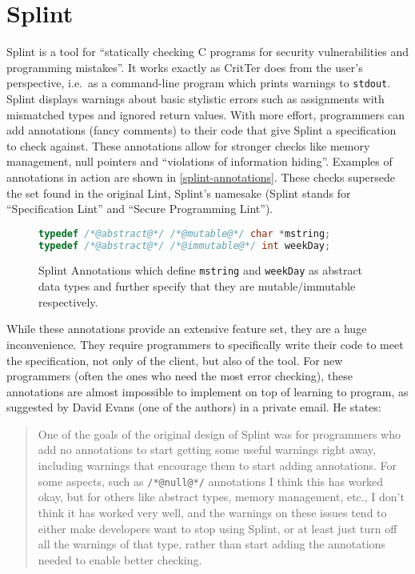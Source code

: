\documentclass[12pt]{report}
\newcommand{\programName}{CritTer\xspace}
\begin{document}
\section{Splint}
\label{sec:splint}

Splint is a tool for ``statically checking C programs for security vulnerabilities and programming 
mistakes''\cite[p.\ 9]{splint-manual}. It works exactly as \programName does from the user's
perspective, i.e.\ as a command-line program which prints warnings to \lstinline{stdout}. 
Splint displays warnings about basic stylistic errors such as assignments with mismatched types and 
ignored return values. With more effort, programmers can add annotations (fancy comments) to their 
code that give Splint a specification to check against. These annotations allow for stronger checks like 
memory management, null pointers and ``violations of information hiding''\cite[p. 9]{splint-manual}. 
Examples of annotations in action are shown in \autoref{splint-annotations}. These checks supersede 
the set found in the original Lint, Splint's namesake (Splint stands for ``Specification Lint'' and ``Secure 
Programming Lint''). 

\begin{figure}
\begin{lstlisting}[frame=single, language=C]
typedef /*@abstract@*/ /*@mutable@*/ char *mstring;
typedef /*@abstract@*/ /*@immutable@*/ int weekDay;
\end{lstlisting}
\caption[Splint Annotations]{Splint Annotations which define \lstinline{mstring} and \lstinline{weekDay} as abstract data types and further specify that they are mutable\slash immutable respectively.} 
\label{splint-annotations}
\end{figure}

While these annotations provide an extensive feature set, they are a huge inconvenience. They 
require programmers to specifically write their code to meet the specification, not only of the client, but 
also of the tool. For new programmers (often the ones who need the most error checking), these 
annotations are almost impossible to implement on top of learning to program, as suggested by  
David Evans (one of the authors) in a private email. He states:
\begin{quote} \singlespacing
One of the goals of the original design of Splint was for programmers who add no annotations to start 
getting some useful warnings right away, including warnings that encourage them to start adding 
annotations.  For some aspects, such as \lstinline{/*@null@*/} annotations I think this has worked okay, 
but for others like abstract types, memory management, etc., I don't think it has worked very well, and the 
warnings on these issues tend to either make developers want to stop using Splint, or at least just turn off 
all the warnings of that type, rather than start adding the annotations needed to enable better 
checking.\cite{evans-email} 
\end{quote}
\end{document}
